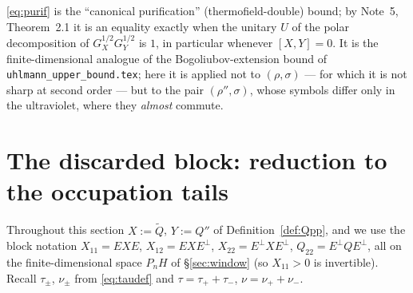 \documentclass[11pt]{article}
\begin{document}

\begin{remark}[sharpness]
\eqref{eq:purif} is the ``canonical purification'' (thermofield-double) bound; by Note~5,
Theorem~2.1 it is an equality exactly when the unitary $U$ of the polar decomposition of
$G_X^{1/2}G_Y^{1/2}$ is $1$, in particular whenever $[X,Y]=0$.  It is the finite-dimensional analogue
of the Bogoliubov-extension bound of \texttt{uhlmann\_upper\_bound.tex}; here it is applied not to
$(\rho,\sigma)$ --- for which it is not sharp at second order --- but to the pair $(\rho'',\sigma)$,
whose symbols differ only in the ultraviolet, where they \emph{almost} commute.
\end{remark}
\section{The discarded block: reduction to the occupation tails}\label{sec:delta}

Throughout this section $X:=\widetilde Q$, $Y:=Q''$ of Definition~\ref{def:Qpp}, and we use the block
notation $X_{11}=EXE$, $X_{12}=EXE^\perp$, $X_{22}=E^\perp XE^\perp$, $Q_{22}=E^\perp QE^\perp$, all on
the finite-dimensional space $P_nH$ of \S\ref{sec:window} (so $X_{11}>0$ is invertible).
Recall $\tau_\pm$, $\nu_\pm$ from \eqref{eq:taudef} and $\tau=\tau_++\tau_-$, $\nu=\nu_++\nu_-$.
\end{document}
